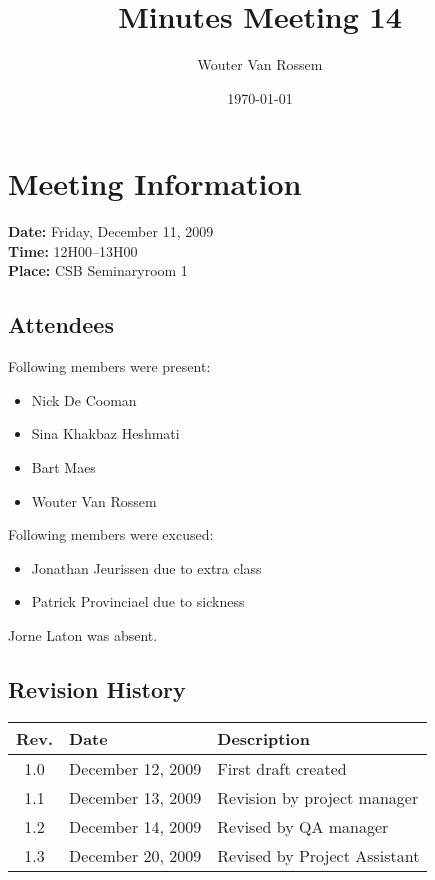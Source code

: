 \documentclass[a4paper, 12pt]{article}
\begin{document}
\title{Minutes Meeting 14}
\author{Wouter Van Rossem}
\date{\today}

\maketitle	
	\section{Meeting Information}
		\textbf{Date:} Friday, December 11, 2009\\
		\textbf{Time:} 12H00--13H00\\
		\textbf{Place:} CSB Seminaryroom 1\\
		\subsection{Attendees}
Following members were present:
			\begin{itemize}
				\item Nick De Cooman
				\item Sina Khakbaz Heshmati
				\item Bart Maes
				\item Wouter Van Rossem
			\end{itemize}
Following members were excused:
			\begin{itemize}
				\item Jonathan Jeurissen due to extra class
				\item Patrick Provinciael due to sickness
			\end{itemize}
Jorne Laton	was absent.		
			
		\subsection{Revision History}
			\begin{tabular}{c | l | l }
				\textbf{Rev.} & \textbf{Date} & \textbf{Description} \\
				\hline
				1.0 & December 12, 2009 & First draft created \\
				1.1 & December 13, 2009 & Revision by project manager \\
				1.2 & December 14, 2009 & Revised by QA manager \\
				1.3 & December 20, 2009 & Revised by Project Assistant \\
				

			\end{tabular}		
	
\end{document}
